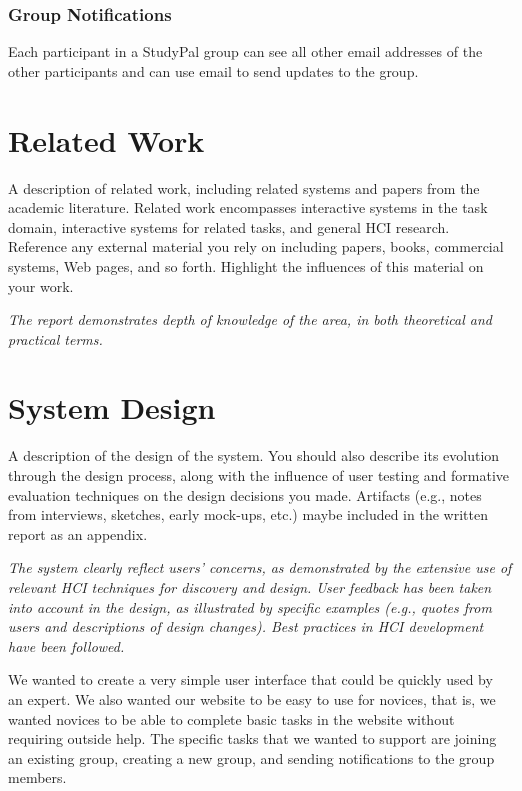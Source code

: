 \documentclass[conference]{IEEEtran}
\begin{document}
\subsubsection{Group Notifications}
Each participant in a StudyPal group can see all other email addresses of the other participants and can use email to send updates to the group.



\section{Related Work}
A description of related work, including related systems and papers from the academic literature. Related work encompasses interactive systems in the task domain, interactive systems for related tasks, and general HCI research. Reference any external material you rely on including papers, books, commercial systems, Web pages, and so forth. Highlight the influences of this material on your work. 

\emph{The report demonstrates depth of knowledge of the area, in both theoretical and practical terms.}




\section{System Design}
A description of the design of the system. You should also describe its evolution through the design process, along with the influence of user testing and formative evaluation techniques on the design decisions you made. Artifacts (e.g., notes from interviews, sketches, early mock-ups, etc.) maybe included in the written report as an appendix. 

\emph{The system clearly reflect users' concerns, as demonstrated by the extensive use of relevant HCI techniques for discovery and design. User feedback has been taken into account in the design, as illustrated by specific examples (e.g., quotes from users and descriptions of design changes). Best practices in HCI development have been followed.}


We wanted to create a very simple user interface that could be quickly used by an expert.
We also wanted our website to be easy to use for novices, that is, we wanted novices to be able to complete basic tasks in the website without requiring outside help.
The specific tasks that we wanted to support are joining an existing group, creating a new group, and sending notifications to the group members.
\end{document}
